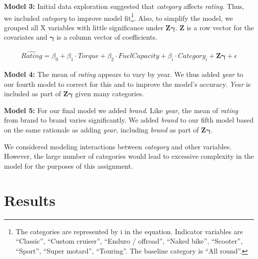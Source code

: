 \documentclass[
]{article}
\begin{document}
\textbf{Model 3:} Initial data exploration suggested that \emph{category} affects
\emph{rating}. Thus, we included \emph{category} to improve model fit\footnote{The categories are represented by i in the equation. Indicator
  variables are ``Classic'', ``Custom cruiser'', ``Enduro / offroad'',
  ``Naked bike'', ``Scooter'', ``Sport'', ``Super motard'', ``Touring''. The
  baseline category is ``All round''.}. Also,
to simplify the model, we grouped all X variables with little
significance under \(\mathbf{Z}\boldsymbol{\gamma}\). \(\mathbf{Z}\) is a
row vector for the covariates and \(\boldsymbol{\gamma}\) is a column
vector of coefficients.

\begin{equation}
  \begin{aligned}
  \widehat{Rating}=\beta_0 + \beta_1\cdot Torque +
           \beta_2\cdot Fuel Capacity +
                  \beta_i\cdot Category_{i} +
                   \mathbf{Z}\boldsymbol{\gamma}
                    + \epsilon
  \end{aligned}
\end{equation}

\textbf{Model 4:} The mean of \emph{rating} appears to vary by year. We thus added
\emph{year} to our fourth model to correct for this and to improve the
model's accuracy. \emph{Year} is included as part of
\(\mathbf{Z}\boldsymbol{\gamma}\) given many categories.

\textbf{Model 5:} For our final model we added \emph{brand}. Like \emph{year}, the mean
of \emph{rating} from brand to brand varies significantly. We added \emph{brand}
to our fifth model based on the same rationale as adding \emph{year,}
including \emph{brand} as part of \(\mathbf{Z}\boldsymbol{\gamma}\).

We considered modeling interactions between \emph{category} and other
variables. However, the large number of categories would lead to
excessive complexity in the model for the purposes of this assignment.

\hypertarget{results}{%
\section{Results}\label{results}}
\end{document}
